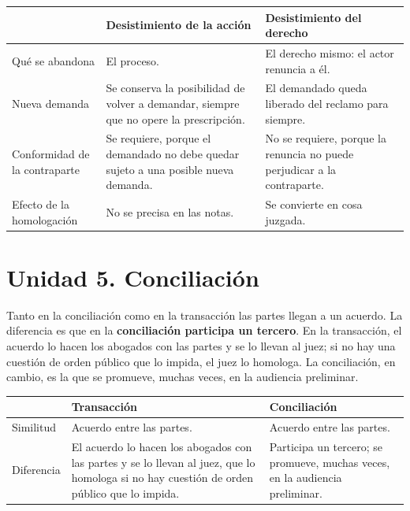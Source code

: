 \documentclass[12pt,oneside]{book}
\begin{document}
\begin{table}[H]
\centering
\begin{tabularx}{\textwidth}{
    >{\RaggedRight\arraybackslash}p{}
    >{\RaggedRight\arraybackslash}X
    >{\RaggedRight\arraybackslash}X
}
\toprule
& \textbf{Desistimiento de la acción} & \textbf{Desistimiento del derecho} \\
\midrule
Qué se abandona &
El proceso. &
El derecho mismo: el actor renuncia a él. \\
\addlinespace
Nueva demanda &
Se conserva la posibilidad de volver a demandar, siempre que no opere la prescripción. &
El demandado queda liberado del reclamo para siempre. \\
\addlinespace
Conformidad de la contraparte &
Se requiere, porque el demandado no debe quedar sujeto a una posible nueva demanda. &
No se requiere, porque la renuncia no puede perjudicar a la contraparte. \\
\addlinespace
Efecto de la homologación &
No se precisa en las notas. &
Se convierte en cosa juzgada. \\
\bottomrule
\end{tabularx}
\end{table}

\section{Unidad 5. Conciliación}

Tanto en la conciliación como en la transacción las partes llegan a un acuerdo. La diferencia es que en la \textbf{conciliación participa un tercero}. En la transacción, el acuerdo lo hacen los abogados con las partes y se lo llevan al juez; si no hay una cuestión de orden público que lo impida, el juez lo homologa. La conciliación, en cambio, es la que se promueve, muchas veces, en la audiencia preliminar.

\begin{table}[H]
\centering
\begin{tabularx}{\textwidth}{
    >{\RaggedRight\arraybackslash}p{}
    >{\RaggedRight\arraybackslash}X
    >{\RaggedRight\arraybackslash}X
}
\toprule
& \textbf{Transacción} & \textbf{Conciliación} \\
\midrule
Similitud &
Acuerdo entre las partes. &
Acuerdo entre las partes. \\
\addlinespace
Diferencia &
El acuerdo lo hacen los abogados con las partes y se lo llevan al juez, que lo homologa si no hay cuestión de orden público que lo impida. &
Participa un tercero; se promueve, muchas veces, en la audiencia preliminar. \\
\bottomrule
\end{tabularx}
\end{table}
\end{document}
